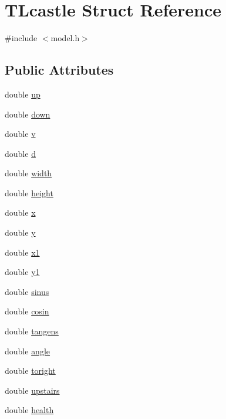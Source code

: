 \hypertarget{struct_t_lcastle}{}\section{T\+Lcastle Struct Reference}
\label{struct_t_lcastle}


{\ttfamily \#include $<$model.\+h$>$}

\subsection*{Public Attributes}
\begin{DoxyCompactItemize}
\item 
double \hyperlink{struct_t_lcastle_adf64f614a549b14e54b7002f305cf6a6}{up}
\item 
double \hyperlink{struct_t_lcastle_a244b75b31e22fa23d057b35be4c31447}{down}
\item 
double \hyperlink{struct_t_lcastle_a2cd8f5c58a7823cfbf48767a6edac665}{v}
\item 
double \hyperlink{struct_t_lcastle_a17656e3c94fa799168beb6e5e89f7d0d}{d}
\item 
double \hyperlink{struct_t_lcastle_a88b2109bd0ed0f20b5cbfdc6be7b1eb8}{width}
\item 
double \hyperlink{struct_t_lcastle_afdb631a1ca3d69fcb9f2cf18bd113f1e}{height}
\item 
double \hyperlink{struct_t_lcastle_a3803e440a150db207c62e238b83fdbea}{x}
\item 
double \hyperlink{struct_t_lcastle_a38ca0e0f50130012db659383e82655ce}{y}
\item 
double \hyperlink{struct_t_lcastle_a8c12c4bd254741e7a5f48b1f905d7c4a}{x1}
\item 
double \hyperlink{struct_t_lcastle_a0aafc497ff39399c90028c0f52fc855d}{y1}
\item 
double \hyperlink{struct_t_lcastle_aa04a7c10bbca4dae20be4f72ee2a1268}{sinus}
\item 
double \hyperlink{struct_t_lcastle_a03a0cd8c4cfe056ffcc8400a318ff27c}{cosin}
\item 
double \hyperlink{struct_t_lcastle_a355c56ea0674586175ff4c712195d64e}{tangens}
\item 
double \hyperlink{struct_t_lcastle_ace89c8b9761bfbe1047c651b29f52c5a}{angle}
\item 
double \hyperlink{struct_t_lcastle_ab9483916901cdb9f1ffacae8c1356d53}{toright}
\item 
double \hyperlink{struct_t_lcastle_acd3309a127951fabdd5b0f77c059ce37}{upstairs}
\item 
double \hyperlink{struct_t_lcastle_a6682d2dcaa15a3456c64ec46e5904046}{health}
\end{DoxyCompactItemize}


